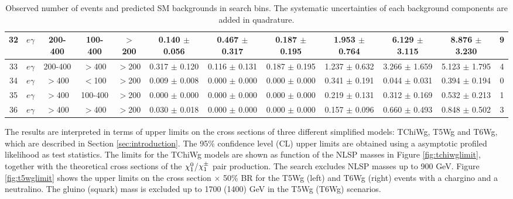 \documentclass[thesis.tex]{subfiles}
\renewcommand\_{\textunderscore\allowbreak}
\begin{document}
\begin{table}[hbtp]
{\begin{tabular}{|c|c|c|c|c|c|c|c|c|c||c|c|}
 32&  $e\gamma$     & 200-400 & 100-400 & $>$200  &     0.140 $\pm$ 0.056  &   0.467 $\pm$ 0.317 &   0.187 $\pm$ 0.195  &   1.953 $\pm$  0.764 &   6.129 $\pm$  3.115 &   8.876 $\pm$   3.230  &   9\\ \hline
 33&  $e\gamma$     & 200-400 & $>$400  & $>$200  &     0.317 $\pm$ 0.120  &   0.116 $\pm$ 0.131 &   0.187 $\pm$ 0.195  &   1.237 $\pm$  0.632 &   3.266 $\pm$  1.659 &   5.123 $\pm$   1.795  &   4\\ \hline
 34&  $e\gamma$     & $>$400 & $<$100   & $>$200  &     0.009 $\pm$ 0.008  &   0.000 $\pm$ 0.000 &   0.000 $\pm$ 0.000  &   0.341 $\pm$  0.191 &   0.044 $\pm$  0.031 &   0.394 $\pm$   0.194  &   0\\ \hline
 35&  $e\gamma$     & $>$400 & 100-400  & $>$200  &     0.000 $\pm$ 0.000  &   0.000 $\pm$ 0.000 &   0.000 $\pm$ 0.000  &   0.219 $\pm$  0.131 &   0.312 $\pm$  0.169 &   0.532 $\pm$   0.213  &   1\\ \hline
 36&  $e\gamma$     & $>$400 & $>$400   & $>$200  &     0.030 $\pm$ 0.018  &   0.000 $\pm$ 0.000 &   0.000 $\pm$ 0.000  &   0.157 $\pm$  0.096 &   0.660 $\pm$  0.493 &   0.848 $\pm$   0.502  &   3\\ \hline
 \end{tabular}
 }
 \caption{Observed number of events and predicted SM backgrounds in search bins. The systematic uncertainties of each background components are added in quadrature.}
 \label{tab:unblindeddata}
 \end{table}    


The results are interpreted in terms of upper limits on the cross sections of three different simplified models: TChiWg, T5Wg and T6Wg, which are described in Section \ref{sec:introduction}. The 95\% confidence level (CL) upper limits are obtained using a asymptotic profiled likelihood as test statistics. The limits for the TChiWg models are shown as function of the NLSP masses in Figure \ref{fig:tchiwglimit}, together with the theoretical cross sections of the $\chi_1^0$/$\chi_1^\pm$ pair production. The search excludes NLSP masses up to 900 GeV. Figure \ref{fig:t5wglimit} shows the upper limits on the cross section $\times$ 50\% BR for the T5Wg (left) and T6Wg (right) events with a chargino and a neutralino. The gluino (squark) mass is excluded up to 1700 (1400) GeV in the T5Wg (T6Wg) scenarios.
\end{document}
